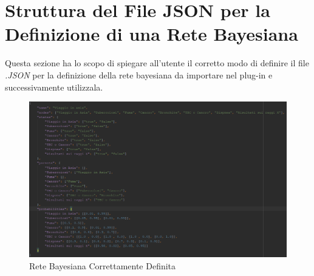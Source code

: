 \section{Struttura del File JSON per la Definizione di una Rete Bayesiana}\label{strutturaRete}

Questa sezione ha lo scopo di spiegare all'utente il corretto modo di definire il file \textit{.JSON} per la definizione della rete bayesiana da importare nel plug-in e successivamente utilizzala.


\begin{figure}[H]
	\begin{center}
		\includegraphics[scale=0.6]{./images/strutturaRete.png}
		 \caption{Rete Bayesiana Correttamente Definita}	
		 \label{ImgRete}
	\end{center}
\end{figure}


